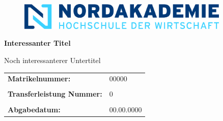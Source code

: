 \thispagestyle{empty}

\vspace{1.5cm}

\begin{figure}[h]
    \centering
    \includegraphics[width=0.9\textwidth]{template/logoNA.png}
\end{figure}

\vspace{1.5cm}

\begin{center}
    \textbf{\Huge{Interessanter Titel}}

\end{center}

\vspace{1.5cm}

\begin{center}
    Noch interessanterer Untertitel\\
\end{center}

\vspace{4.0cm}

\begin{flushleft}
    \begin{tabular}{ll}
        \textbf{Matrikelnummer:}  & 00000 \\
        &\\
        \textbf{Transferleistung Nummer:} & 0 \\
        &\\
        \textbf{Abgabedatum:}  & 00.00.0000 \\
    \end{tabular}
\end{flushleft}

\pagebreak